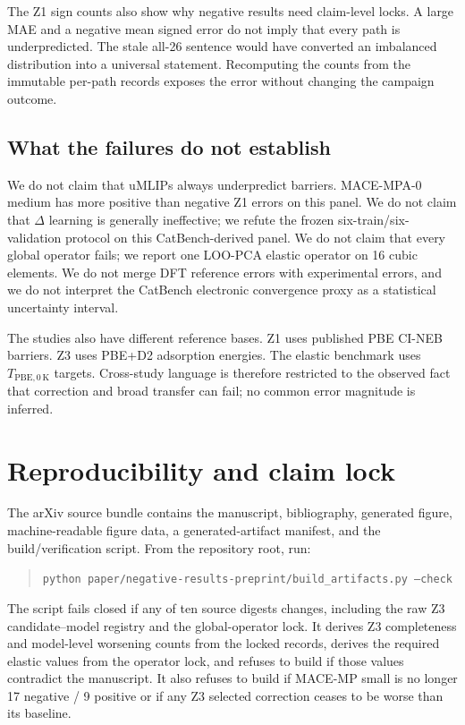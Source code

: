 \documentclass[11pt]{article}
\newcommand{\code}[1]{\texttt{#1}}
\begin{document}
The Z1 sign counts also show why negative results need claim-level locks. A large MAE and a negative mean signed error do not imply that every path is underpredicted. The stale all-26 sentence would have converted an imbalanced distribution into a universal statement. Recomputing the counts from the immutable per-path records exposes the error without changing the campaign outcome.

\subsection{What the failures do not establish}

We do not claim that uMLIPs always underpredict barriers. MACE-MPA-0 medium has more positive than negative Z1 errors on this panel. We do not claim that $\Delta$ learning is generally ineffective; we refute the frozen six-train/six-validation protocol on this CatBench-derived panel. We do not claim that every global operator fails; we report one LOO-PCA elastic operator on 16 cubic elements. We do not merge DFT reference errors with experimental errors, and we do not interpret the CatBench electronic convergence proxy as a statistical uncertainty interval.

The studies also have different reference bases. Z1 uses published PBE CI-NEB barriers. Z3 uses PBE+D2 adsorption energies. The elastic benchmark uses $T_{\mathrm{PBE},0\,\mathrm K}$ targets. Cross-study language is therefore restricted to the observed fact that correction and broad transfer can fail; no common error magnitude is inferred.

\section{Reproducibility and claim lock}

The arXiv source bundle contains the manuscript, bibliography, generated figure, machine-readable figure data, a generated-artifact manifest, and the build/verification script. From the repository root, run:
\begin{quote}
\code{python paper/negative-results-preprint/build\_artifacts.py --check}
\end{quote}
The script fails closed if any of ten source digests changes, including the raw Z3 candidate--model registry and the global-operator lock. It derives Z3 completeness and model-level worsening counts from the locked records, derives the required elastic values from the operator lock, and refuses to build if those values contradict the manuscript. It also refuses to build if MACE-MP small is no longer 17 negative / 9 positive or if any Z3 selected correction ceases to be worse than its baseline.
\end{document}
